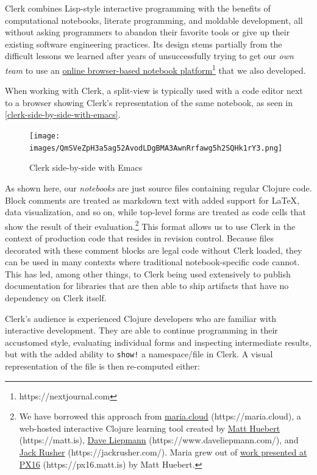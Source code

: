 \documentclass[sigconf,screen,pbalance=true]{acmart}
\newcommand{\passthrough}[1]{#1}
\begin{document}
Clerk combines Lisp-style interactive programming with the benefits of computational notebooks, literate programming, and moldable development, all without asking programmers to abandon their favorite tools or give up their existing software engineering practices. Its design stems partially from the difficult lessons we learned after years of unsuccessfully trying to get our \emph{own team} to use an {\href{https://nextjournal.com}{online browser-based notebook platform}\footnote{https://nextjournal.com}} that we also developed.

When working with Clerk, a split-view is typically used with a code editor next to a browser showing Clerk's representation of the same notebook, as seen in \autoref{clerk-side-by-side-with-emacs}.

\begin{figure}
\hypertarget{clerk-side-by-side-with-emacs}{%
\centering
\texttt{[image: images/QmSVeZpH3a5ag52AvodLDgBMA3AwnRrfawg5h2SQHk1rY3.png]}
\caption{Clerk side-by-side with Emacs}\label{clerk-side-by-side-with-emacs}
}
\end{figure}

As shown here, our \emph{notebooks} are just source files containing regular Clojure code. Block comments are treated as markdown text with added support for LaTeX, data visualization, and so on, while top-level forms are treated as code cells that show the result of their evaluation.\footnote{We have borrowed this approach from {\href{https://maria.cloud}{maria.cloud} (https://maria.cloud)}, a web-hosted interactive Clojure learning tool created by {\href{https://matt.is}{Matt Huebert} (https://matt.is)}, {\href{https://www.daveliepmann.com/}{Dave Liepmann} (https://www.daveliepmann.com/)}, and {\href{https://jackrusher.com/}{Jack Rusher} (https://jackrusher.com/)}. Maria grew out of {\href{https://px16.matt.is}{work presented at PX16} (https://px16.matt.is)} by Matt Huebert.} This format allows us to use Clerk in the context of production code that resides in revision control. Because files decorated with these comment blocks are legal code without Clerk loaded, they can be used in many contexts where traditional notebook-specific code cannot. This has led, among other things, to Clerk being used extensively to publish documentation for libraries that are then able to ship artifacts that have no dependency on Clerk itself.

Clerk's audience is experienced Clojure developers who are familiar with interactive development. They are able to continue programming in their accustomed style, evaluating individual forms and inspecting intermediate results, but with the added ability to \passthrough{\lstinline"show!"} a namespace/file in Clerk. A visual representation of the file is then re-computed either:
\end{document}
